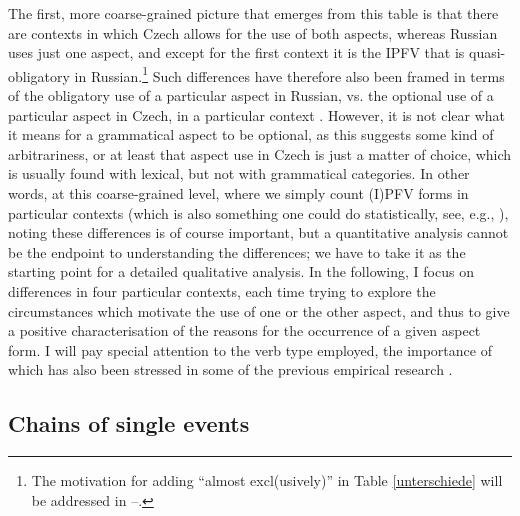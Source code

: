 \documentclass[output=paper,colorlinks,citecolor=brown]{langscibook}
\begin{document}
The first, more coarse-grained picture that emerges from this table is that there are contexts in which Czech allows for the use of both aspects, whereas Russian uses just one aspect, and except for the first context it is the IPFV that is quasi-obligatory in Russian.\footnote{The motivation for adding ``almost excl(usively)'' in Table \ref{unterschiede} will be addressed in --.} Such differences have therefore also been framed in terms of the obligatory use of a particular aspect in Russian, vs. the optional use of a particular aspect in Czech, in a particular context \citep[e.g.][]{bondarko59,krizkova61,sirokova71,petruxina00}. However, it is not clear what it means for a grammatical aspect to be optional, as this suggests some kind of arbitrariness, or at least that aspect use in Czech is just a matter of choice, which is usually found with lexical, but not with grammatical categories. In other words, at this coarse-grained level, where we simply count (I)PFV forms in particular contexts (which is also something one could do statistically, see, e.g., \citealt{waldenfels12, waldenfels14, duebbersdiss,klimek22}), noting these differences is of course important, but a quantitative analysis cannot be the endpoint to understanding the differences; we have to take it as the starting point for a detailed qualitative analysis. In the following, I focus on differences in four particular contexts, each time trying to explore the circumstances which motivate the use of one or the other aspect, and thus to give a positive characterisation of the reasons for the occurrence of a given aspect form. I will pay special attention to the verb type employed, the importance of which has also been stressed in some of the previous empirical research \citep[e.g.][]{eckert84,stunova93,gehrke02}. 

\subsection{Chains of single events}
\label{sec:chains}
\end{document}
